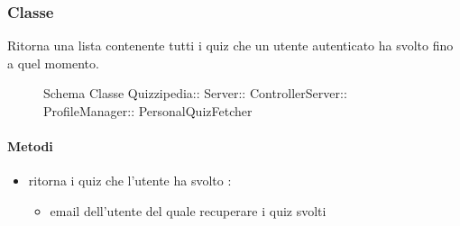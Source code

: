 \subsubsection{Classe }
Ritorna una lista contenente tutti i quiz che un utente autenticato ha svolto fino a quel momento.
\begin{figure}[H]
\centering
\noindent{}
\caption[Schema Classe PersonalQuizFetcher]{Schema Classe Quizzipedia:: Server:: ControllerServer:: ProfileManager:: PersonalQuizFetcher}
\end{figure}
\paragraph{Metodi}
\begin{itemize}
\item {}
\newline
ritorna i quiz che l'utente ha svolto
\newline
{} :
\begin{itemize}
\item {}
\newline
email dell'utente del quale recuperare i quiz svolti
\end{itemize}
\end{itemize}
